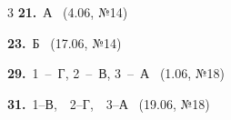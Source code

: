 \documentclass[12pt]{article}
\begin{document}
\ifshowsolutions
{}
\begin{multicols}{3}\noindent
\noindent\textbf{21.}~А \ {\scriptsize\color{gray}(4.06, №14)}\par
\noindent\textbf{23.}~Б \ {\scriptsize\color{gray}(17.06, №14)}\par
\noindent\textbf{29.}~1~--~Г, 2~--~В, 3~--~А \ {\scriptsize\color{gray}(1.06, №18)}\par
\noindent\textbf{31.}~1--В,\ \ 2--Г,\ \ 3--А \ {\scriptsize\color{gray}(19.06, №18)}\par
\end{multicols}
\fi

\endgroup
\end{document}
